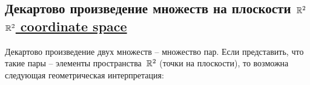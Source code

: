 \documentclass[a4paper,10pt]{article}
\begin{document}
\subsection{Декартово произведение множеств на плоскости \texorpdfstring{$\mathbb{R}^2$}{R\string^2}%
\texorpdfstring{\hfill\normalfont\href{https://en.wikipedia.org/wiki/Real_coordinate_space}{$\mathbb{R}^2$ coordinate space}}{}}

Декартово произведение двух множеств -- множество пар. Если представить, что такие пары -- элементы пространства~$\mathbb{R}^2$ (точки на плоскости), то возможна следующая геометрическая интерпретация:

\end{document}
